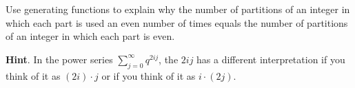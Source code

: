\documentclass{book}
\begin{document}
\setcounter{cpjt}{323}
\addtocounter{cpjt}{-1}
\begin{activity}\label{activity-316}
\hypertarget{p-1601}{}%
Use generating functions to explain why the number of partitions of an integer in which each part is used an even number of times equals the number of partitions of an integer in which each part is even.%
\par\smallskip%
\noindent\textbf{Hint}.\hypertarget{hint-214}{}\quad%
\hypertarget{p-1602}{}%
In the power series \(\sum_{j=0}^\infty q^{2ij}\), the \(2ij\) has a different interpretation if you think of it as \((2i) \cdot j\) or if you think of it as \(i \cdot (2j)\).%
\par\smallskip%
\noindent\end{activity}

\clearpage
\end{document}
